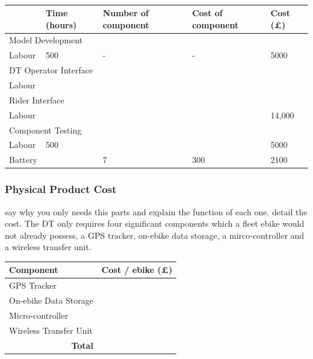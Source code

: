 \documentclass[a4paper, 10pt]{article}
\numberwithin{equation}{section}
\begin{document}
\begin{table}[h]
\centering
\caption{}
\label{tab:DMC}
\begin{tabular}{|l|l|l|l|l|}
\hline
        & Time (hours) & Number of component & Cost of component & Cost (£) \\ \hline
\multicolumn{5}{|l|}{Model Development}                                     \\ \hline
Labour  & 500& -                   & -                 & 5000    \\ \hline
\multicolumn{5}{|l|}{DT Operator Interface}                                 \\ \hline
Labour  &              &                     &                   &          \\ \hline
\multicolumn{5}{|l|}{Rider Interface}                                       \\ \hline
Labour  &              &                     &                   & 14,000   \\ \hline
\multicolumn{5}{|l|}{Component Testing}                                     \\ \hline
Labour  & 500          &                     &                   & 5000     \\ \hline
Battery &              & 7                  & 300               & 2100     \\ \hline
\end{tabular}
\end{table}

\FloatBarrier
\subsubsection*{Physical Product Cost}
say why you only needs this parts and explain the function of each one. detail the cost.
The DT only requires four significant components which a fleet ebike would not already possess, a GPS tracker, on-ebike data storage, a mirco-controller and a wireless transfer unit.

\begin{table}[h]
\centering
\begin{tabular}{|l|l|}
\hline
Component                            & Cost / ebike (£) \\ \hline \hline
GPS Tracker                          &                  \\ \hline
On-ebike Data Storage                &                  \\ \hline
Micro-controller                     &                  \\ \hline
Wireless Transfer Unit               &                  \\ \hline \hline
\multicolumn{1}{|r|}{\textbf{Total}} &                  \\ \hline
\end{tabular}
\end{table}
\end{document}
